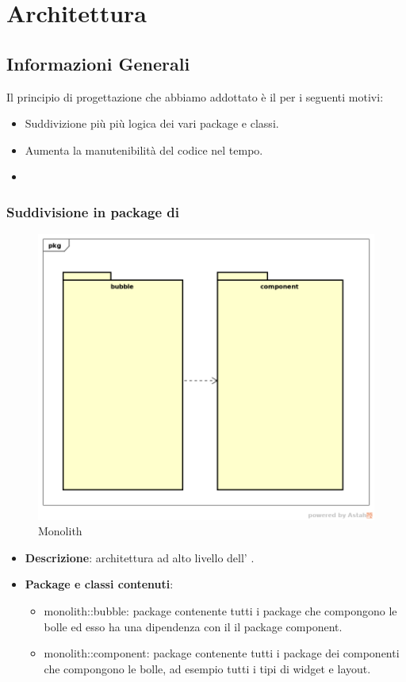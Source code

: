 \newpage
\section{Architettura}
\subsection{Informazioni Generali}
Il principio di progettazione che abbiamo addottato è il  per i seguenti motivi:
\begin{itemize}
\item Suddivizione più più logica dei vari package e classi.
\item Aumenta la manutenibilità del codice nel tempo.
\item
\end{itemize}

\subsubsection{Suddivisione in package  di }
\label{Monolith}
\begin{figure}[H]
	\centering
	\includegraphics[scale=0.5]{Sezioni/imgPackage/Monolith.png}
	\caption{Monolith}
\end{figure}
\begin{itemize}
	\item{\textbf{Descrizione}}: architettura ad alto livello dell'  .
	\item{\textbf{Package e classi contenuti}}:
	\begin{itemize}
	\item{monolith::bubble}: package contenente tutti i package che compongono le bolle ed esso ha una dipendenza con il il package component.
	\item{monolith::component}: package contenente tutti i package dei componenti che compongono le bolle, ad esempio tutti i tipi di widget e layout.
	\end{itemize}

\end{itemize}


